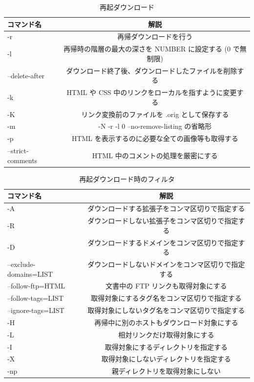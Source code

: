 \begin{table}[H]
  \begin{center}
    \caption{再起ダウンロード}
    \begin{tabular}{|l|c|} \hline
      コマンド名 & 解説  \\ \hline
  -r & 再帰ダウンロードを行う \\
  -l & 再帰時の階層の最大の深さを NUMBER に設定する (0 で無制限) \\
--delete-after & ダウンロード終了後、ダウンロードしたファイルを削除する \\
  -k & HTML や CSS 中のリンクをローカルを指すように変更する \\
  -K & リンク変換前のファイルを .orig として保存する \\
  -m & -N -r -l 0 --no-remove-listing の省略形 \\
  -p & HTML を表示するのに必要な全ての画像等も取得する \\
--strict-comments & HTML 中のコメントの処理を厳密にする \\ \hline
    \end{tabular}
  \end{center}
\end{table}

\begin{table}[H]
  \begin{center}
    \caption{再起ダウンロード時のフィルタ}
    \begin{tabular}{|l|c|} \hline
      コマンド名 & 解説  \\ \hline
  -A & ダウンロードする拡張子をコンマ区切りで指定する \\
  -R & ダウンロードしない拡張子をコンマ区切りで指定する \\
  -D & ダウンロードするドメインをコンマ区切りで指定する \\
--exclude-domains=LIST & ダウンロードしないドメインをコンマ区切りで指定する \\
--follow-ftp=HTML & 文書中の FTP リンクも取得対象にする \\
--follow-tags=LIST & 取得対象にするタグ名をコンマ区切りで指定する \\
--ignore-tags=LIST & 取得対象にしないタグ名をコンマ区切りで指定する \\
  -H & 再帰中に別のホストもダウンロード対象にする \\
  -L & 相対リンクだけ取得対象にする \\
  -I & 取得対象にするディレクトリを指定する \\
  -X & 取得対象にしないディレクトリを指定する \\
  -np & 親ディレクトリを取得対象にしない \\ \hline
 \end{tabular}
  \end{center}
\end{table}



